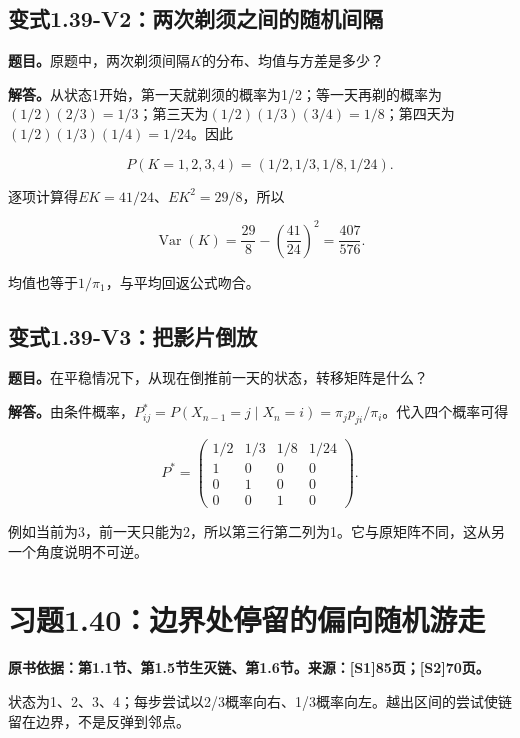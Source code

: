 \documentclass[
  11pt,
  a4paper,
  UTF8,
  fontset=fandol]{ctexart}
\begin{document}
\subsection{变式1.39-V2：两次剃须之间的随机间隔}\label{ux53d8ux5f0f1.39-v2ux4e24ux6b21ux5243ux987bux4e4bux95f4ux7684ux968fux673aux95f4ux9694}

\textbf{题目。}原题中，两次剃须间隔\(K\)的分布、均值与方差是多少？

\textbf{解答。}从状态1开始，第一天就剃须的概率为1/2；等一天再剃的概率为\((1/2)(2/3)=1/3\)；第三天为\((1/2)(1/3)(3/4)=1/8\)；第四天为\((1/2)(1/3)(1/4)=1/24\)。因此

\[
P(K=1,2,3,4)=(1/2,1/3,1/8,1/24).
\]

逐项计算得\(EK=41/24\)、\(EK^2=29/8\)，所以

\[
\boxed{\operatorname{Var}(K)=\frac{29}{8}-\left(\frac{41}{24}\right)^2=\frac{407}{576}.}
\]

均值也等于\(1/\pi_1\)，与平均回返公式吻合。

\subsection{变式1.39-V3：把影片倒放}\label{ux53d8ux5f0f1.39-v3ux628aux5f71ux7247ux5012ux653e}

\textbf{题目。}在平稳情况下，从现在倒推前一天的状态，转移矩阵是什么？

\textbf{解答。}由条件概率，\(P^*_{ij}=P(X_{n-1}=j\mid X_n=i)=\pi_jp_{ji}/\pi_i\)。代入四个概率可得

\[
\boxed{P^*=\begin{pmatrix}
1/2&1/3&1/8&1/24\\1&0&0&0\\0&1&0&0\\0&0&1&0
\end{pmatrix}.}
\]

例如当前为3，前一天只能为2，所以第三行第二列为1。它与原矩阵不同，这从另一个角度说明不可逆。

\section{习题1.40：边界处停留的偏向随机游走}\label{ux4e60ux98981.40ux8fb9ux754cux5904ux505cux7559ux7684ux504fux5411ux968fux673aux6e38ux8d70}

\textbf{原书依据：第1.1节、第1.5节生灭链、第1.6节。来源：{[}S1{]}85页；{[}S2{]}70页。}

状态为1、2、3、4；每步尝试以2/3概率向右、1/3概率向左。越出区间的尝试使链留在边界，不是反弹到邻点。
\end{document}
